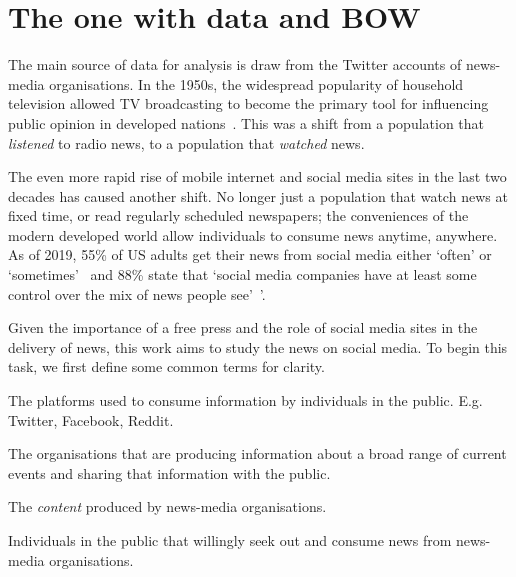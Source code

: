 \chapter{The one with data and BOW\label{ch:dataandBOW}}

The main source of data for analysis is draw from the Twitter accounts of news-media organisations. In the 1950s, the widespread popularity of household television allowed TV broadcasting to become the primary tool for influencing public opinion in developed nations~.  This was a shift from a population that \emph{listened} to radio news, to a population that \emph{watched} news. 

The even more rapid rise of mobile internet and social media sites in the last two decades has caused another shift. No longer just a population that watch news at fixed time, or read regularly scheduled newspapers; the conveniences of the modern developed world allow individuals to consume news anytime, anywhere. As of 2019, 55\% of US adults get their news from social media either `often' or `sometimes'~ and 88\% state that `social media companies have at least some control over the mix of news people see'~'\cite{shearerAmericansAreWary2019}.

Given the importance of a free press and the role of social media sites in the delivery of news, this work aims to study the news on social media. To begin this task, we first define some common terms for clarity.

\begin{definition}
	The platforms used to consume information by individuals in the public. E.g. Twitter, Facebook, Reddit.
\end{definition}

\begin{definition}
	The organisations that are producing information about a broad range of current events and sharing that information with the public.
\end{definition}

\begin{definition}[News]
	The \emph{content} produced by news-media organisations. 
\end{definition}


\begin{definition}[Consumers]
	Individuals in the public that willingly seek out and consume news from news-media organisations.
\end{definition}

